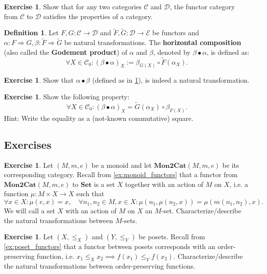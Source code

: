 \documentclass[a4paper,11pt, oneside,titlepage=false]{scrbook}
\theoremstyle{plain}
\theoremstyle{definition}
\newtheorem{dfn}[thm]{Definition}
\newtheorem{exer}[thm]{Exercise}
\newcommand{\Cat}[1]{\mathcal{#1}}
\newcommand{\CC}{\Cat{C}}
\newcommand{\DD}{\Cat{D}}
\newcommand{\EE}{\Cat{E}}
\newcommand{\Catb}[1]{\mathbf{#1}}
\newcommand{\SET}{\Catb{Set}}
\newcommand{\MONtoCAT}{\Catb{Mon2Cat}}
\newcommand{\Ob}[1]{{#1}_0}
\newcommand{\NatTrans}[3]{#1 : #2 \Rightarrow #3}
\newcommand{\co}[2]{\ensuremath{#2 \circ #1}}
\begin{document}
\begin{exer} Show that for any two categories $\CC$ and $\DD$, the functor category from $\CC$ to $\DD$ satisfies the properties of a category.
\end{exer}

\begin{dfn}\label{dfn:nattrans_horcomp} Let $F,G : \CC\to\DD$ and $\tilde{F},\tilde{G}:\DD\to\EE$ be functors and $\NatTrans{\alpha}{F}{G}, \NatTrans{\beta}{\tilde{F}}{\tilde{G}}$ be natural transformations. The \textbf{horizontal composition} (also called the \textbf{Godement product}) of $\alpha$ and $\beta$, denoted by $\beta \bullet \alpha$, is defined as:
\begin{equation}\label{eqn:nattrans_horcomp}
\forall X\in \Ob{\CC}: (\beta\bullet\alpha)_X := \co{\tilde{F}(\alpha_X)}{\beta_{G(X)}}.
\end{equation}
\end{dfn}

\begin{exer} Show that $\alpha\bullet\beta$ (defined as in \cref{dfn:nattrans_horcomp}), is indeed a natural transformation.
\end{exer}

\begin{exer} Show the following property: 
\[
\forall X\in \Ob{\CC}: (\beta\bullet\alpha)_X = \co{\beta_{F(X)}}{\tilde{G}(\alpha_X)}.
\]
Hint: Write the equality as a (not-known commutative) square.
\end{exer}

\subsection{Exercises}
\begin{exer} Let $(M,m,e)$ be a monoid and let $\MONtoCAT(M,m,e)$ be its corresponding category. Recall from \cref{ex:monoid_functors} that a functor from $\MONtoCAT(M,m,e)$ to $\SET$ is a set $X$ together with an action of $M$ on $X$, i.e. a function $\mu: M\times X\to X$ such that 
\[
\forall x\in X: \mu(e,x) = x, \quad \forall n_1,n_2\in M, x\in X: \mu(n_1, \mu(n_2,x)) = \mu(m(n_1,n_2), x).
\]
We will call a set $ X $ with an action of $ M $ on $ X $ an $ M $-set.
Characterize/describe the natural transformations between $M$-sets.
\end{exer}

\begin{exer} Let $(X,\leq_X)$ and $(Y,\leq_Y)$ be posets. Recall from \cref{ex:poset_functors} that a functor between posets corresponds with an order-preserving function, i.e. $x_1 \leq_X x_2 \implies f(x_1) \leq_Y f(x_2)$. Characterize/describe the natural transformations between order-preserving functions.
\end{exer}
\end{document}
